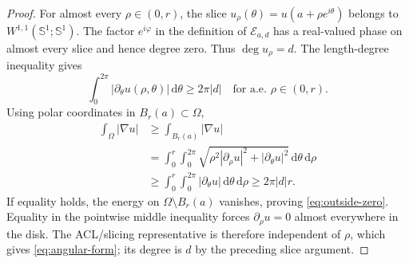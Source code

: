 \documentclass[11pt]{article}
\newcommand{\Sone}{\mathbb S^1}
\newcommand{\Ead}{\mathcal E_{a,d}}
\newcommand{\dd}{\,\mathrm d}
\begin{document}
\begin{proof}
For almost every $\rho\in(0,r)$, the slice
$u_\rho(\theta)=u(a+\rho e^{i\theta})$ belongs to
$W^{1,1}(\Sone;\Sone)$. The factor $e^{i\varphi}$ in the definition of
$\Ead$ has a real-valued phase on almost every slice and hence degree zero.
Thus $\deg u_\rho=d$. The length-degree inequality gives
\begin{equation}\label{eq:length-degree}
 \int_0^{2\pi}|\partial_\theta u(\rho,\theta)|\dd\theta
 \ge 2\pi|d|
 \quad\text{for a.e. }\rho\in(0,r).
\end{equation}
Using polar coordinates in $B_r(a)\subset\Omega$,
\begin{align*}
 \int_\Omega|\nabla u|
 &\ge \int_{B_r(a)}|\nabla u|\\
 &=\int_0^r\!\int_0^{2\pi}
 \sqrt{\rho^2|\partial_\rho u|^2+|\partial_\theta u|^2}
 \dd\theta\dd\rho\\
 &\ge\int_0^r\!\int_0^{2\pi}|\partial_\theta u|
 \dd\theta\dd\rho
 \ge 2\pi|d|r.
\end{align*}
If equality holds, the energy on $\Omega\setminus B_r(a)$ vanishes, proving
\eqref{eq:outside-zero}. Equality in the pointwise middle inequality forces
$\partial_\rho u=0$ almost everywhere in the disk. The ACL/slicing
representative is therefore independent of $\rho$, which gives
\eqref{eq:angular-form}; its degree is $d$ by the preceding slice argument.
\end{proof}
\end{document}
